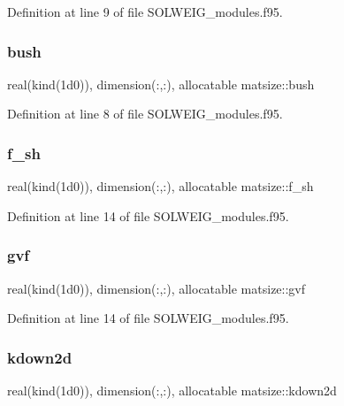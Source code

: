 Definition at line 9 of file S\+O\+L\+W\+E\+I\+G\+\_\+modules.\+f95.

\mbox{\label{namespacematsize_a3891f5a70b2d3e3f1ce049f9ab702e87}} 
\subsubsection{\texorpdfstring{bush}{bush}}
{\footnotesize\ttfamily real(kind(1d0)), dimension(\+:,\+:), allocatable matsize\+::bush}



Definition at line 8 of file S\+O\+L\+W\+E\+I\+G\+\_\+modules.\+f95.

\mbox{\label{namespacematsize_a6ab950e24bfe92c823016e8ed6e52873}} 
\subsubsection{\texorpdfstring{f\+\_\+sh}{f\_sh}}
{\footnotesize\ttfamily real(kind(1d0)), dimension(\+:,\+:), allocatable matsize\+::f\+\_\+sh}



Definition at line 14 of file S\+O\+L\+W\+E\+I\+G\+\_\+modules.\+f95.

\mbox{\label{namespacematsize_a30597ac2227214d3724f34f551f3c904}} 
\subsubsection{\texorpdfstring{gvf}{gvf}}
{\footnotesize\ttfamily real(kind(1d0)), dimension(\+:,\+:), allocatable matsize\+::gvf}



Definition at line 14 of file S\+O\+L\+W\+E\+I\+G\+\_\+modules.\+f95.

\mbox{\label{namespacematsize_a965c1a4db75855ca038aef657921cec9}} 
\subsubsection{\texorpdfstring{kdown2d}{kdown2d}}
{\footnotesize\ttfamily real(kind(1d0)), dimension(\+:,\+:), allocatable matsize\+::kdown2d}



